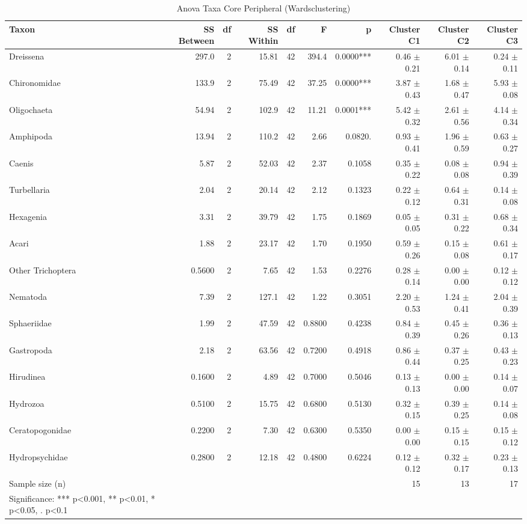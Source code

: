 \begin{table}[htbp]
  \centering
  \caption{Anova Taxa Core Peripheral (Wardsclustering)}
  \label{tab:WardsClustering_tables_anova_taxa_core_peripheral}
  \small
  \begin{tabular}{lrrrrrrrrr}
    \toprule
    Taxon & SS Between & df & SS Within & df  & F & p & Cluster C1 & Cluster C2 & Cluster C3 \\
    \midrule
    Dreissena & 297.0 & 2 & 15.81 & 42 & 394.4 & 0.0000*** & 0.46 $\pm$ 0.21 & 6.01 $\pm$ 0.14 & 0.24 $\pm$ 0.11 \\
    Chironomidae & 133.9 & 2 & 75.49 & 42 & 37.25 & 0.0000*** & 3.87 $\pm$ 0.43 & 1.68 $\pm$ 0.47 & 5.93 $\pm$ 0.08 \\
    Oligochaeta & 54.94 & 2 & 102.9 & 42 & 11.21 & 0.0001*** & 5.42 $\pm$ 0.32 & 2.61 $\pm$ 0.56 & 4.14 $\pm$ 0.34 \\
    Amphipoda & 13.94 & 2 & 110.2 & 42 & 2.66 & 0.0820. & 0.93 $\pm$ 0.41 & 1.96 $\pm$ 0.59 & 0.63 $\pm$ 0.27 \\
    Caenis & 5.87 & 2 & 52.03 & 42 & 2.37 & 0.1058 & 0.35 $\pm$ 0.22 & 0.08 $\pm$ 0.08 & 0.94 $\pm$ 0.39 \\
    Turbellaria & 2.04 & 2 & 20.14 & 42 & 2.12 & 0.1323 & 0.22 $\pm$ 0.12 & 0.64 $\pm$ 0.31 & 0.14 $\pm$ 0.08 \\
    Hexagenia & 3.31 & 2 & 39.79 & 42 & 1.75 & 0.1869 & 0.05 $\pm$ 0.05 & 0.31 $\pm$ 0.22 & 0.68 $\pm$ 0.34 \\
    Acari & 1.88 & 2 & 23.17 & 42 & 1.70 & 0.1950 & 0.59 $\pm$ 0.26 & 0.15 $\pm$ 0.08 & 0.61 $\pm$ 0.17 \\
    Other Trichoptera & 0.5600 & 2 & 7.65 & 42 & 1.53 & 0.2276 & 0.28 $\pm$ 0.14 & 0.00 $\pm$ 0.00 & 0.12 $\pm$ 0.12 \\
    Nematoda & 7.39 & 2 & 127.1 & 42 & 1.22 & 0.3051 & 2.20 $\pm$ 0.53 & 1.24 $\pm$ 0.41 & 2.04 $\pm$ 0.39 \\
    Sphaeriidae & 1.99 & 2 & 47.59 & 42 & 0.8800 & 0.4238 & 0.84 $\pm$ 0.39 & 0.45 $\pm$ 0.26 & 0.36 $\pm$ 0.13 \\
    Gastropoda & 2.18 & 2 & 63.56 & 42 & 0.7200 & 0.4918 & 0.86 $\pm$ 0.44 & 0.37 $\pm$ 0.25 & 0.43 $\pm$ 0.23 \\
    Hirudinea & 0.1600 & 2 & 4.89 & 42 & 0.7000 & 0.5046 & 0.13 $\pm$ 0.13 & 0.00 $\pm$ 0.00 & 0.14 $\pm$ 0.07 \\
    Hydrozoa & 0.5100 & 2 & 15.75 & 42 & 0.6800 & 0.5130 & 0.32 $\pm$ 0.15 & 0.39 $\pm$ 0.25 & 0.14 $\pm$ 0.08 \\
    Ceratopogonidae & 0.2200 & 2 & 7.30 & 42 & 0.6300 & 0.5350 & 0.00 $\pm$ 0.00 & 0.15 $\pm$ 0.15 & 0.15 $\pm$ 0.12 \\
    Hydropsychidae & 0.2800 & 2 & 12.18 & 42 & 0.4800 & 0.6224 & 0.12 $\pm$ 0.12 & 0.32 $\pm$ 0.17 & 0.23 $\pm$ 0.13 \\
    Sample size (n) &  &  &  &  &  &  & 15 & 13 & 17 \\
    Significance: *** p<0.001, ** p<0.01, * p<0.05, . p<0.1 &  &  &  &  &  &  &  &  &  \\
    \bottomrule
  \end{tabular}
\end{table}
